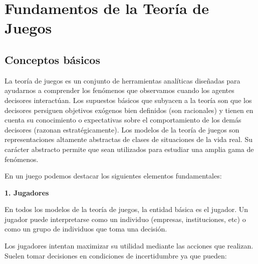 \documentclass[12pt,a4paper,]{book}
\title{}
\author{Nombre Completo Autor}
\date{18/11/2021}
\def\ifdoblecara{} %
\def\ifprincipal{} %
\let\ifprincipal\undefined %
\numberwithin{dummy}{section}
\theoremstyle{ocrenumbox}
\theoremstyle{blacknumex}
\theoremstyle{blacknumbox}
\theoremstyle{ocrenum}
\theoremstyle{ocrenum}
\begin{document}




\raggedbottom

\ifdefined\ifprincipal
\else
\setlength{\parindent}{1em}
\pagestyle{fancy}
\setcounter{tocdepth}{4}
\tableofcontents

\fi

\ifdefined\ifdoblecara
\fancyhead{}{}
\fancyhead[LE,RO]{\scriptsize\rightmark}
\fancyfoot[LO,RE]{\scriptsize\slshape \leftmark}
\fancyfoot[C]{}
\fancyfoot[LE,RO]{\footnotesize\thepage}
\else
\fancyhead{}{}
\fancyhead[RO]{\scriptsize\rightmark}
\fancyfoot[LO]{\scriptsize\slshape \leftmark}
\fancyfoot[C]{}
\fancyfoot[RO]{\footnotesize\thepage}
\fi

\renewcommand{\headrulewidth}{0.4pt}
\renewcommand{\footrulewidth}{0.4pt}

\chapter{Fundamentos de la Teoría de
Juegos}\label{fundamentos-de-la-teoruxeda-de-juegos}

\section{Conceptos básicos}\label{conceptos-buxe1sicos}

La teoría de juegos es un conjunto de herramientas analíticas diseñadas
para ayudarnos a comprender los fenómenos que observamos cuando los
agentes decisores interactúan. Los supuestos básicos que subyacen a la
teoría son que los decisores persiguen objetivos exógenos bien definidos
(son racionales) y tienen en cuenta su conocimiento o expectativas sobre
el comportamiento de los demás decisores (razonan estratégicamente). Los
modelos de la teoría de juegos son representaciones altamente abstractas
de clases de situaciones de la vida real. Su carácter abstracto permite
que sean utilizados para estudiar una amplia gama de fenómenos.

En un juego podemos destacar los siguientes elementos fundamentales:

\textbf{1. Jugadores}

En todos los modelos de la teoría de juegos, la entidad básica es el
jugador. Un jugador puede interpretarse como un individuo (empresas,
instituciones, etc) o como un grupo de individuos que toma una decisión.

Los jugadores intentan maximizar su utilidad mediante las acciones que
realizan. Suelen tomar decisiones en condiciones de incertidumbre ya que
pueden:
\end{document}
